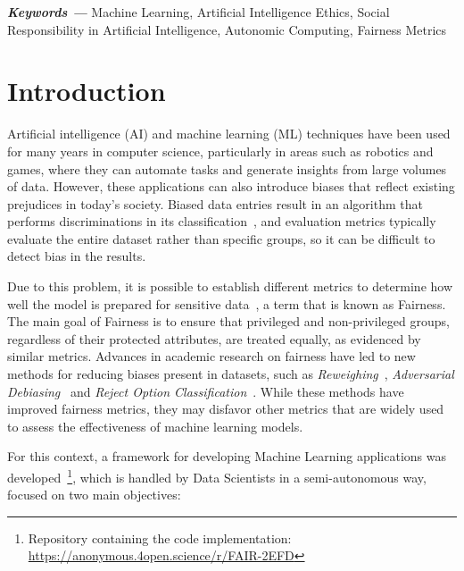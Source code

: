 \documentclass[sigconf]{acmart}
\providecommand{\keywords}[1]
{
  \small	
  \textbf{\textit{Keywords ---}} #1
}
\begin{document}

\keywords{Machine Learning, Artificial Intelligence Ethics, Social Responsibility in Artificial Intelligence, Autonomic Computing, Fairness Metrics}

\maketitle

\section{Introduction}

Artificial intelligence (AI) and machine learning (ML) techniques have been used for many years in computer science, particularly in areas such as robotics and games, where they can automate tasks and generate insights from large volumes of data. However, these applications can also introduce biases that reflect existing prejudices in today's society. Biased data entries result in an algorithm that performs discriminations in its classification~\citep{Buolamwini_2018}, and evaluation metrics typically evaluate the entire dataset rather than specific groups, so it can be difficult to detect bias in the results.

Due to this problem, it is possible to establish different metrics to determine how well the model is prepared for sensitive data~\citep{Begley_2021}, a term that is known as Fairness. The main goal of Fairness is to ensure that privileged and non-privileged groups, regardless of their protected attributes, are treated equally, as evidenced by similar metrics. Advances in academic research on fairness have led to new methods for reducing biases present in datasets, such as \textit{Reweighing}~\citep{Kamiran_2011}, \textit{Adversarial Debiasing}~\citep{Zhang_2018} and \textit {Reject Option Classification}~\citep{Kamiran_2012}. While these methods have improved fairness metrics, they may disfavor other metrics that are widely used to assess the effectiveness of machine learning models.

For this context, a framework for developing Machine Learning applications was developed~\footnote{Repository containing the code implementation: \url{https://anonymous.4open.science/r/FAIR-2EFD}}, which is handled by Data Scientists in a semi-autonomous way, focused on two main objectives:
\end{document}
